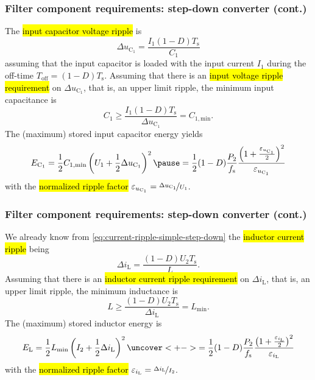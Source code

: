 \begin{frame}
	\frametitle{Filter component requirements: step-down converter (cont.)}
	The \hl{input capacitor voltage ripple} is
	\begin{equation}
		\Delta u_\mathrm{C_1} = \frac{I_1(1-D)T_\mathrm{s}}{C_1}
	\end{equation}
	assuming that the input capacitor is loaded with the input current $I_1$ during the off-time $T_\mathrm{off}=(1-D)T_\mathrm{s}$. \pause Assuming that there is an \hl{input voltage ripple requirement} on $\Delta u_\mathrm{C_1}$, that is, an upper limit ripple, the minimum input capacitance is
	\begin{equation}
		C_1 \geq \frac{I_1(1-D)T_\mathrm{s}}{\Delta u_\mathrm{C_1}}=C_{1,\mathrm{min}}.
	\end{equation}\pause
	The (maximum) stored input capacitor energy yields
	\begin{equation}
		E_\mathrm{C_1} = \frac{1}{2} C_{1,\mathrm{min}} \left(U_1 + \frac{1}{2}\Delta u_\mathrm{C_1}\right)^2 \pause = \frac{1}{2} (1-D)\frac{P_2}{f_\mathrm{s}}\frac{\left(1+\frac{\varepsilon_{u_\mathrm{C_1}}}{2}\right)^2}{\varepsilon_{u_\mathrm{C_1}}}
	\end{equation}
	with the \hl{normalized ripple factor} $\varepsilon_{u_\mathrm{C_1}} = \nicefrac{\Delta u_\mathrm{C_1}}{U_1}$.
\end{frame}


\begin{frame}
	\frametitle{Filter component requirements: step-down converter (cont.)}
	\onslide<+->We already know from \eqref{eq:current-ripple-simple-step-down} the \hl{inductor current ripple} being
	\begin{equation*}
		\Delta i_\mathrm{L} = \frac{(1-D)U_2T_\mathrm{s}}{L}.
	\end{equation*}\onslide<+->
	Assuming that there is an \hl{inductor current ripple requirement} on $\Delta i_\mathrm{L}$, that is, an upper limit ripple, the minimum inductance is
	\begin{equation}
		L \geq \frac{(1-D)U_2T_\mathrm{s}}{\Delta i_\mathrm{L}} = L_{\mathrm{min}}.
		\label{eq:inductor-minimum-inductance-step-down}
	\end{equation}\onslide<+->
	The (maximum) stored inductor energy is
	\begin{equation}
		E_\mathrm{L} = \frac{1}{2} L_{\mathrm{min}} \left(I_2 + \frac{1}{2}\Delta i_\mathrm{L}\right)^2 \uncover<+->{= \frac{1}{2} (1-D)\frac{P_2}{f_\mathrm{s}}\frac{\left(1+\frac{\varepsilon_{i_\mathrm{L}}}{2}\right)^2}{\varepsilon_{i_\mathrm{L}}}}
	\end{equation}\onslide<4->
	with the \hl{normalized ripple factor} $\varepsilon_{i_\mathrm{L}} = \nicefrac{\Delta i_\mathrm{L}}{I_2}$.
\end{frame}

